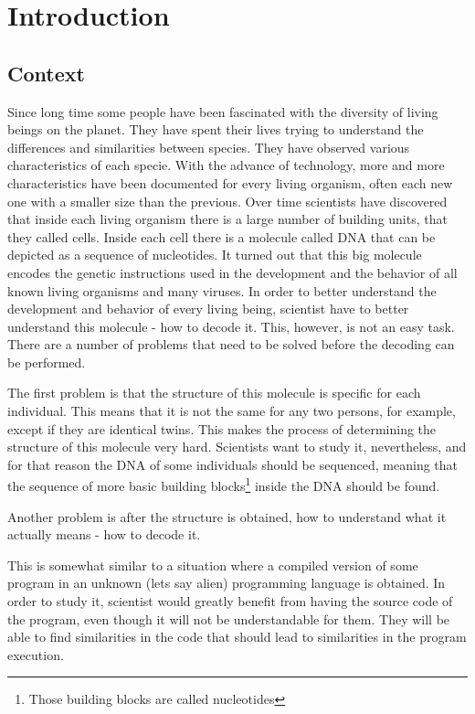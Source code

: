 \documentclass[11pt]{article}
\begin{document}
\section{Introduction}
\label{sec:Introduction}

\subsection{Context}
\label{sub:Contex}
Since long time some people have been fascinated with the diversity of
living beings on the planet. They have spent their lives trying to understand
the differences and similarities between species. They have observed various
characteristics of each specie. With the advance of technology, more and more
characteristics have been documented for every living organism, often each new
one with a smaller size than the previous. Over time scientists have discovered
that inside each living organism there is a large number of building units, that
they called cells. Inside each cell there is a molecule called DNA that can be
depicted as a sequence of nucleotides. It turned out that this big molecule
encodes the genetic instructions used in the development and the behavior of all
known living organisms and many viruses. In order to better understand the
development and behavior of every living being, scientist have to better
understand this molecule - how to decode it. This, however, is not an
easy task. There are a number of problems that need to be solved before the
decoding can be performed.

The first problem is that the structure of this molecule is specific for each
individual. This means that it is not the same for any
two persons, for example, except if they are identical twins. This makes the
process of determining the structure of this molecule very hard. Scientists want
to study it, nevertheless, and for that reason the DNA of some individuals
should be sequenced, meaning that the sequence of more basic building
blocks\footnote{Those building blocks are called nucleotides} inside the DNA
should be found.

Another problem is after the structure is obtained, how to understand what it
actually means - how to decode it.

This is somewhat similar to a situation where a compiled version of some program
in an unknown (lets say alien) programming language is obtained. In order to
study it, scientist would greatly benefit from having the source code of the
program, even though it will not be understandable for them. They will be able
to find similarities in the code that should lead to similarities in the program
execution.
\end{document}
